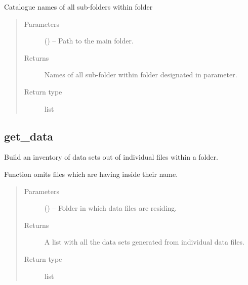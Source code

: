 \documentclass[letterpaper,10pt,english]{sphinxmanual}
\begin{document}
\begin{fulllineitems}
\label{\detokenize{api/ucf.get_all_sub_folders_within_folder:ucf.get_all_sub_folders_within_folder}}
Catalogue names of all sub-folders within folder
\begin{quote}\begin{description}
\item[{Parameters}] \leavevmode
{} () -- Path to the main folder.

\item[{Returns}] \leavevmode
Names of all sub-folder within folder designated in  parameter.

\item[{Return type}] \leavevmode
list

\end{description}\end{quote}

\end{fulllineitems}



\subsection{get\_data}
\label{\detokenize{api/ucf.get_data:get-data}}\label{\detokenize{api/ucf.get_data::doc}}

\begin{fulllineitems}
\label{\detokenize{api/ucf.get_data:ucf.get_data}}
Build an inventory of data sets out of individual files within a
folder.

Function omits files which are having  inside their name.
\begin{quote}\begin{description}
\item[{Parameters}] \leavevmode
{} () -- Folder in which data files are residing.

\item[{Returns}] \leavevmode
A list with all the data sets generated from individual data
files.

\item[{Return type}] \leavevmode
list

\end{description}\end{quote}

\end{fulllineitems}
\end{document}
